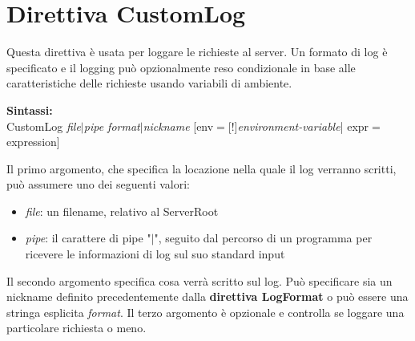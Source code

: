 \section{Direttiva CustomLog}
Questa direttiva è usata per loggare le richieste al server. Un formato di log è specificato e il logging può opzionalmente reso condizionale in base alle caratteristiche delle richieste usando variabili di ambiente.
\begin{center}
    \textbf{Sintassi:}\\
    CustomLog \emph{file}$|$\emph{pipe format}$|$\emph{nickname} [env$=$[!]\emph{environment-variable}| expr$=$expression]\\
\end{center}
Il primo argomento, che specifica la locazione nella quale il log verranno scritti, può assumere uno dei seguenti valori:
\begin{itemize}
    \item \emph{file}: un filename, relativo al ServerRoot
    \item \emph{pipe}: il carattere di pipe "$|$", seguito dal percorso di un programma per ricevere le informazioni di log sul suo standard input
\end{itemize}
Il secondo argomento specifica cosa verrà scritto sul log. Può specificare sia un nickname definito precedentemente dalla \textbf{direttiva LogFormat} o può essere una stringa esplicita \emph{format}. 
Il terzo argomento è opzionale e controlla se loggare una particolare richiesta o meno.


